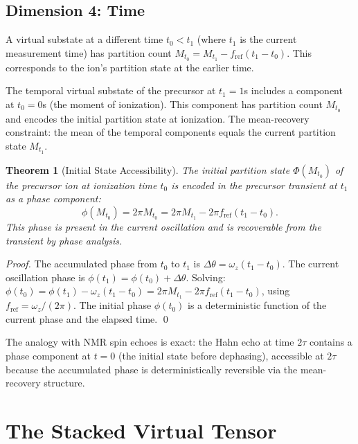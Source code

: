 \documentclass[twocolumn,10pt,a4paper]{article}
\theoremstyle{thmstyle}
\newtheorem{theorem}{Theorem}[section]
\theoremstyle{definition}
\theoremstyle{remark}
\newcommand{\PhiMap}{\varPhi}
\begin{document}
\subsection{Dimension 4: Time}

A virtual substate at a different time $t_0 < t_1$ (where $t_1$ is the
current measurement time) has partition count $M_{t_0} = M_{t_1} - f_{\text{ref}}(t_1 - t_0)$.
This corresponds to the ion's partition state at the earlier time.

The temporal virtual substate of the precursor at $t_1 = 1$s includes
a component at $t_0 = 0$s (the moment of ionization). This component
has partition count $M_{t_0}$ and encodes the initial partition state
at ionization. The mean-recovery constraint: the mean of the temporal
components equals the current partition state $M_{t_1}$.

\begin{theorem}[Initial State Accessibility]
\label{thm:initial}
The initial partition state $\PhiMap(M_{t_0})$ of the precursor ion at
ionization time $t_0$ is encoded in the precursor transient at $t_1$
as a phase component:
\begin{equation}
\phi(M_{t_0}) = 2\pi M_{t_0} = 2\pi M_{t_1} - 2\pi f_{\text{ref}}(t_1 - t_0).
\label{eq:initial-phase}
\end{equation}
This phase is present in the current oscillation and is recoverable
from the transient by phase analysis.
\end{theorem}

\begin{proof}
The accumulated phase from $t_0$ to $t_1$ is
$\Delta\theta = \omega_z(t_1 - t_0)$. The current oscillation phase is
$\phi(t_1) = \phi(t_0) + \Delta\theta$. Solving:
$\phi(t_0) = \phi(t_1) - \omega_z(t_1 - t_0) = 2\pi M_{t_1} - 2\pi f_{\text{ref}}(t_1-t_0)$,
using $f_{\text{ref}} = \omega_z/(2\pi)$. The initial phase $\phi(t_0)$
is a deterministic function of the current phase and the elapsed time. \qed
\end{proof}

The analogy with NMR spin echoes \citep{hahn1950} is exact: the Hahn
echo at time $2\tau$ contains a phase component at $t = 0$ (the initial
state before dephasing), accessible at $2\tau$ because the accumulated
phase is deterministically reversible via the mean-recovery structure.

\section{The Stacked Virtual Tensor}
\label{sec:tensor}
\end{document}
